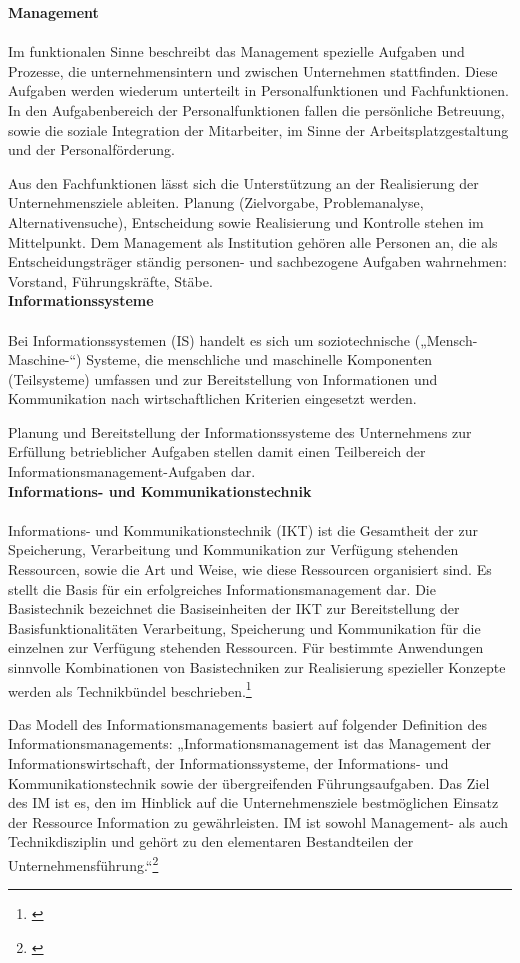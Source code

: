 \textbf{Management}\\\\
Im funktionalen Sinne beschreibt das Management spezielle Aufgaben und Prozesse, die unternehmensintern und zwischen Unternehmen stattfinden.
Diese Aufgaben werden wiederum unterteilt in Personalfunktionen und Fachfunktionen. In den Aufgabenbereich der Personalfunktionen fallen die persönliche Betreuung, sowie die soziale Integration der Mitarbeiter, im Sinne der Arbeitsplatzgestaltung und der Personalförderung.

Aus den Fachfunktionen lässt sich die Unterstützung an der Realisierung der Unternehmensziele ableiten. Planung (Zielvorgabe, Problemanalyse, Alternativensuche), Entscheidung sowie Realisierung und Kontrolle stehen im Mittelpunkt.
Dem Management als Institution gehören alle Personen an, die als Entscheidungsträger ständig personen- und sachbezogene Aufgaben wahrnehmen: Vorstand, Führungskräfte, Stäbe.\\

\textbf{Informationssysteme}\\\\
Bei Informationssystemen (IS) handelt es sich um soziotechnische („Mensch-Maschine-“) Systeme, die menschliche und maschinelle Komponenten (Teilsysteme) umfassen und zur Bereitstellung von Informationen und Kommunikation nach wirtschaftlichen Kriterien eingesetzt werden.

Planung und Bereitstellung der Informationssysteme des Unternehmens zur Erfüllung betrieblicher Aufgaben stellen damit einen Teilbereich der Informationsmanagement-Aufgaben dar.\\ 

\textbf{Informations- und Kommunikationstechnik}\\\\
Informations- und Kommunikationstechnik (IKT) ist die Gesamtheit der zur Speicherung, Verarbeitung und Kommunikation zur Verfügung stehenden Ressourcen, sowie die Art und Weise, wie diese Ressourcen organisiert sind.
Es stellt die Basis für ein erfolgreiches Informationsmanagement dar.
Die Basistechnik bezeichnet die Basiseinheiten der IKT zur Bereitstellung der Basisfunktionalitäten Verarbeitung, Speicherung und Kommunikation für die einzelnen zur Verfügung stehenden Ressourcen.
Für bestimmte Anwendungen sinnvolle Kombinationen von Basistechniken zur Realisierung spezieller Konzepte werden als Technikbündel beschrieben.\footnote{\cite{krcmar_einfuhrung_2015}}

Das Modell des Informationsmanagements basiert auf folgender Definition des Informationsmanagements:
„Informationsmanagement ist das Management der Informationswirtschaft, der Informationssysteme, der Informations- und Kommunikationstechnik sowie der übergreifenden Führungsaufgaben. Das Ziel des IM ist es, den im Hinblick auf die Unternehmensziele bestmöglichen Einsatz der Ressource Information zu gewährleisten. IM ist sowohl Management- als auch Technikdisziplin und gehört zu den elementaren Bestandteilen der Unternehmensführung.“\footnote{\cite{krcmar_einfuhrung_2015}}

